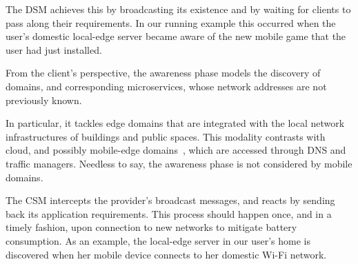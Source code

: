 The DSM achieves this by broadcasting its existence and by waiting for clients to pass along their requirements. In our running example this occurred when the user's domestic local-edge server became aware of the new mobile game that the user had just installed. 



From the client's perspective, the awareness phase models the discovery of domains, and corresponding microservices, whose network addresses are not previously known. 

In particular, it tackles edge domains that are integrated with the local network infrastructures of buildings and public spaces. This modality contrasts with cloud, and possibly mobile-edge domains~\cite{ahmed2016isco}, which are accessed through DNS and traffic managers. Needless to say, the awareness phase is not considered by mobile domains.

The CSM intercepts the provider's broadcast messages, and reacts by sending back its application requirements. This process should happen once, and in a timely fashion, upon connection to new networks to mitigate battery consumption. As an example, the local-edge server in our user's home is discovered when her mobile device connects to her domestic Wi-Fi network. 




